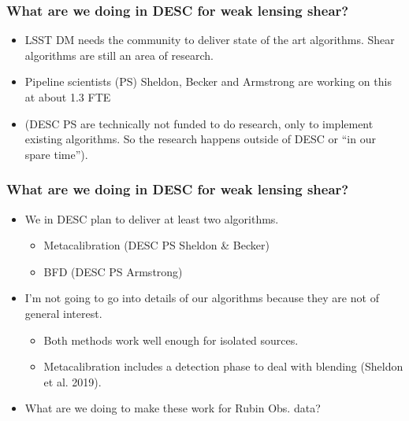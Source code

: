 \documentclass{beamer}
\begin{document}
\frame
{

    \frametitle{What are we doing in DESC for weak lensing shear?}


    \begin{itemize}

        \item LSST DM needs the community to deliver state of the art algorithms.
            Shear algorithms are still an area of research.

        \item Pipeline scientists (PS) Sheldon, Becker and Armstrong
            are working on this at about 1.3 FTE
            
        \item (DESC PS are technically not funded to do research, only to
            implement existing algorithms.  So the research happens outside of
            DESC or ``in our spare time'').


    \end{itemize}

}

\frame
{

    \frametitle{What are we doing in DESC for weak lensing shear?}


    \begin{itemize}

        \item We in DESC plan to deliver at least two algorithms.

            \begin{itemize}
                \item Metacalibration (DESC PS Sheldon \& Becker)
                \item BFD (DESC PS Armstrong)
            \end{itemize}

        \item I'm not going to go into details of our algorithms because they
            are not of general interest.
            \begin{itemize}

                \item Both methods work well enough for isolated sources.
                    
                \item Metacalibration includes a detection phase to deal with
                    blending (Sheldon et al. 2019).
            \end{itemize}

        \item What are we doing to make these work for Rubin Obs. data?

    \end{itemize}

}
\end{document}
